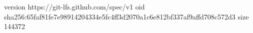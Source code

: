 version https://git-lfs.github.com/spec/v1
oid sha256:65faf81fe7e98914204334e5fc4ff3d2070a1c6e812bf337af9affd708c572d3
size 144372
